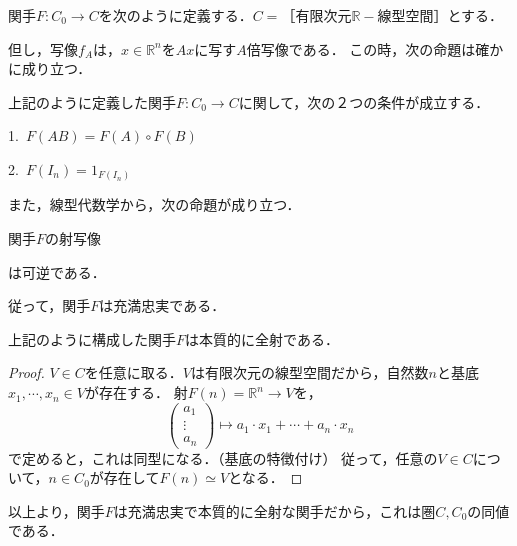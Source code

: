 \documentclass[uplatex, 12pt, dvipdfmx]{jsreport}
\begin{document}
関手$F:C_0\to C$を次のように定義する．$C=［有限次元\mathbb{R}-線型空間］$とする．
\begin{center}\end{center}
但し，写像$f_A$は，$x\in\mathbb{R}^n$を$Ax$に写す$A$倍写像である．
この時，次の命題は確かに成り立つ．
\begin{proposition}
    上記のように定義した関手$F:C_0\to C$に関して，次の２つの条件が成立する．\rm{}

    1.\, $F(AB) = F(A)\circ F(B)$

    2.\, $F(I_n) = 1_{F(I_n)}$
\end{proposition}
また，線型代数学から，次の命題が成り立つ．
\begin{proposition}
    関手$F$の射写像
    \begin{center}\end{center}
    は可逆である．
\end{proposition}
従って，関手$F$は充満忠実である．
\begin{proposition}
    上記のように構成した関手$F$は本質的に全射である．
\end{proposition}
\begin{proof}
    $V\in C$を任意に取る．$V$は有限次元の線型空間だから，自然数$n$と基底$x_1,\cdots,x_n\in V$が存在する．
    射$F(n)=\mathbb{R}^n\to V$を，
    $$\left( \begin{array}{c}
        a_1 \\ \vdots \\ a_n
    \end{array} \right)\mapsto a_1\cdot x_1 + \cdots + a_n\cdot x_n$$
    で定めると，これは同型になる．（基底の特徴付け）
    従って，任意の$V\in C$について，$n\in C_0$が存在して$F(n)\simeq V$となる．
\end{proof}
以上より，関手$F$は充満忠実で本質的に全射な関手だから，これは圏$C,C_0$の同値である．
\end{document}
